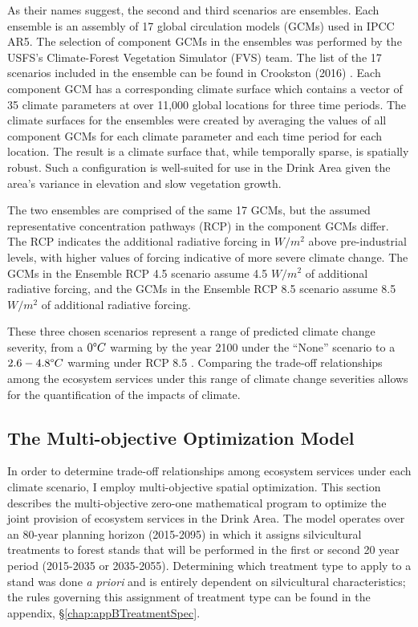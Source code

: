 As their names suggest, the second and third scenarios are ensembles. Each ensemble is an assembly of 17 global circulation models (GCMs) used in IPCC AR5. The selection of component GCMs in the ensembles was performed by the USFS's Climate-Forest Vegetation Simulator (FVS) \cite{dixon2002essential} team. The list of the 17 scenarios included in the ensemble can be found in Crookston (2016) \cite{ClimateModelsInFVSEnsemble}. Each component GCM has a corresponding climate surface which contains a vector of 35 climate parameters at over 11,000 global locations for three time periods. The climate surfaces for the ensembles were created by averaging the values of all component GCMs for each climate parameter and each time period for each location. The result is a climate surface that, while temporally sparse, is spatially robust. Such a configuration is well-suited for use in the Drink Area given the area's variance in elevation and slow vegetation growth.

The two ensembles are comprised of the same 17 GCMs, but the assumed representative concentration pathways (RCP) in the component GCMs differ. The RCP indicates the additional radiative forcing in $W/m^2$ above pre-industrial levels, with higher values of forcing indicative of more severe climate change. The GCMs in the Ensemble RCP 4.5 scenario assume 4.5 $W/m^2$ of additional radiative forcing, and the GCMs in the Ensemble RCP 8.5 scenario assume 8.5 $W/m^2$ of additional radiative forcing.

These three chosen scenarios represent a range of predicted climate change severity, from a $0 \degree C$ warming by the year 2100 under the ``None'' scenario to a $2.6-4.8 \degree C$ warming under RCP 8.5 \cite{ipcc2013climate}. Comparing the trade-off relationships among the ecosystem services under this range of climate change severities allows for the quantification of the impacts of climate.

\subsection{The Multi-objective Optimization Model}
\label{sec:model}
In order to determine trade-off relationships among ecosystem services under each climate scenario, I employ multi-objective spatial optimization. This section describes the multi-objective zero-one mathematical program to optimize the joint provision of ecosystem services in the Drink Area. The model operates over an 80-year planning horizon (2015-2095) in which it assigns silvicultural treatments to forest stands that will be performed in the first or second 20 year period (2015-2035 or 2035-2055). Determining which treatment type to apply to a stand was done \textit{a priori} and is entirely dependent on silvicultural characteristics; the rules governing this assignment of treatment type can be found in the appendix, \S \ref{chap:appBTreatmentSpec}.


